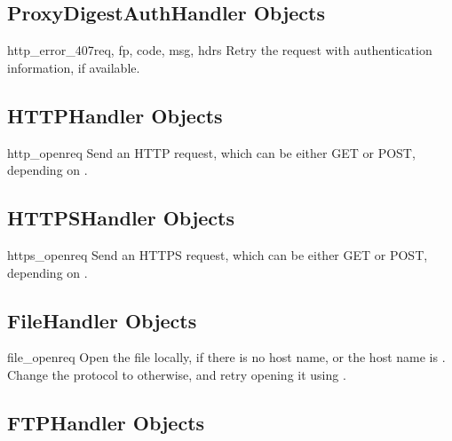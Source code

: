 \subsection{ProxyDigestAuthHandler Objects
            \label{proxy-digest-auth-handler}}

\begin{methoddesc}[ProxyDigestAuthHandler]{http_error_407}{req, fp, code, 
                                                        msg, hdrs}
Retry the request with authentication information, if available.
\end{methoddesc}


\subsection{HTTPHandler Objects \label{http-handler-objects}}

\begin{methoddesc}[HTTPHandler]{http_open}{req}
Send an HTTP request, which can be either GET or POST, depending on
.
\end{methoddesc}


\subsection{HTTPSHandler Objects \label{https-handler-objects}}

\begin{methoddesc}[HTTPSHandler]{https_open}{req}
Send an HTTPS request, which can be either GET or POST, depending on
.
\end{methoddesc}


\subsection{FileHandler Objects \label{file-handler-objects}}

\begin{methoddesc}[FileHandler]{file_open}{req}
Open the file locally, if there is no host name, or
the host name is . Change the
protocol to  otherwise, and retry opening
it using .
\end{methoddesc}


\subsection{FTPHandler Objects \label{ftp-handler-objects}}

